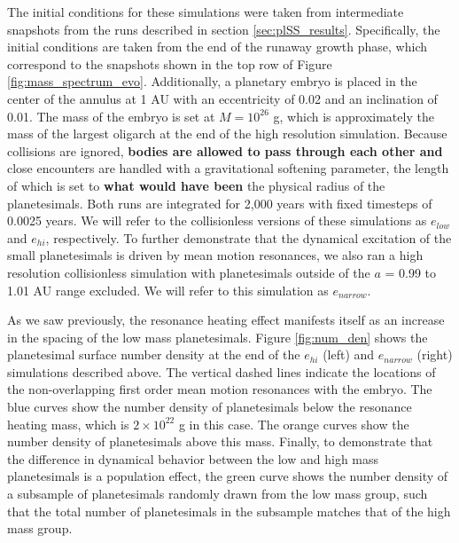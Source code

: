 The initial conditions for these simulations were taken from intermediate snapshots from the runs described in section 
\ref{sec:plSS_results}. Specifically, the initial conditions are taken from the end of the runaway growth phase, which correspond to the 
snapshots shown in the top row of Figure \ref{fig:mass_spectrum_evo}. Additionally, a planetary embryo is placed in the center of 
the annulus at 1 AU with an eccentricity of 0.02 and an inclination of 0.01. The mass of the embryo is set at $M = 10^{26}$ g, 
which is approximately the mass of the largest oligarch at the end of the high resolution simulation. Because collisions are 
ignored, \textbf{bodies are allowed to pass through each other and} close encounters are handled with a gravitational softening parameter, the length of which is set to \textbf{what would have been} the physical radius 
of the planetesimals. Both runs are integrated for 2,000 years with fixed timesteps of 0.0025 years. We will refer to the 
collisionless versions of these simulations as $e_{low}$ and $e_{hi}$, respectively. To further demonstrate that the dynamical 
excitation of the small planetesimals is driven by mean motion resonances, we also ran a high resolution collisionless simulation 
with planetesimals outside of the $a$ = 0.99 to 1.01 AU range excluded. We will refer to this simulation as $e_{narrow}$.

As we saw previously, the resonance heating effect manifests itself as an increase in the spacing of the low mass planetesimals. 
Figure \ref{fig:num_den} shows the planetesimal surface number density at the end of the $e_{hi}$ (left) and $e_{narrow}$ (right) 
simulations described above. The vertical dashed lines indicate the locations of the non-overlapping first order mean motion 
resonances with the embryo. The blue curves show the number density of planetesimals below the resonance heating mass, 
which is $2 \times 10^{22}$ g in this case. The orange curves show the number density of planetesimals above this mass. 
Finally, to demonstrate that the difference in dynamical behavior between the low and high mass planetesimals is a population 
effect, the green curve shows the number density of a subsample of planetesimals randomly drawn from the low mass group, 
such that the total number of planetesimals in the subsample matches that of the high mass group.


